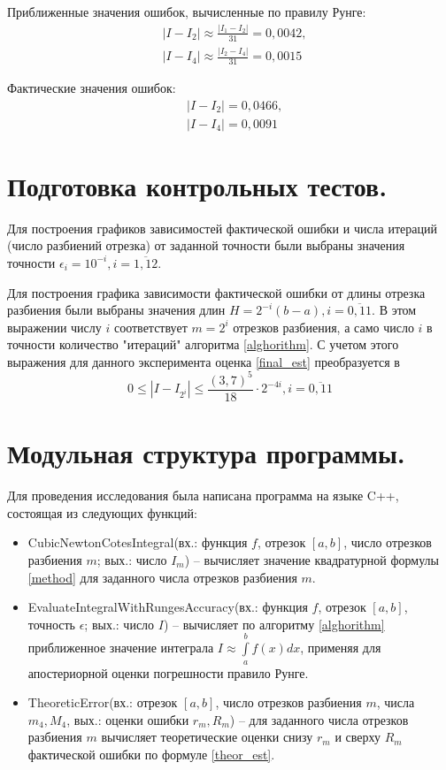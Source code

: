 \documentclass[a4paper, 12pt]{article}
\begin{document}
	Приближенные значения ошибок, вычисленные по правилу Рунге:
	\begin{equation*}
		\begin{aligned}
			&|I-I_2|\approx\frac{|I_1-I_2|}{31}=0,0042,\\
			&|I-I_4|\approx\frac{|I_2-I_4|}{31}=0,0015
		\end{aligned}
	\end{equation*}

	Фактические значения ошибок:
	\begin{equation*}
		\begin{aligned}
			&|I-I_2|=0,0466,\\
			&|I-I_4|=0,0091
		\end{aligned}
	\end{equation*}
	
	\section{Подготовка контрольных тестов.}
	
	Для построения графиков зависимостей фактической ошибки и числа итераций (число разбиений отрезка) от заданной точности были выбраны значения точности $\epsilon_i=10^{-i}, i=\overline{1,12}$. 
	
	Для построения графика зависимости фактической ошибки от длины отрезка разбиения были выбраны значения длин $H=2^{-i}(b-a), i=\overline{0,11}$. В этом выражении числу $i$ соответствует $m=2^{i}$ отрезков разбиения, а само число $i$ в точности количество "итераций" алгоритма \ref{alghorithm}. С учетом этого выражения для данного эксперимента оценка \eqref{final_est} преобразуется в
	\begin{equation}
		0 \leq |I-I_{2^i}| \leq \frac{(3,7)^5}{18}\cdot2^{-4i}, i=\overline{0,11}
	\end{equation}
	
	\section{Модульная структура программы.}
	Для проведения исследования была написана программа на языке C++, состоящая из следующих функций:
	\begin{itemize}
		\item CubicNewtonCotesIntegral(вх.: функция $f$, отрезок $[a,b]$, число отрезков разбиения $m$; вых.: число $I_m$) -- вычисляет значение квадратурной формулы \eqref{method} для заданного числа отрезков разбиения $m$.
		\item EvaluateIntegralWithRungesAccuracy(вх.: функция $f$, отрезок $[a,b]$, точность $\epsilon$; вых.: число $I$) -- вычисляет по алгоритму \ref{alghorithm} приближенное значение интеграла $I\approx\int\limits_a^bf(x)dx$, применяя для апостериорной оценки погрешности правило Рунге.
		\item TheoreticError(вх.: отрезок $[a,b]$, число отрезков разбиения $m$, числа $m_4,M_4$, вых.: оценки ошибки $r_m,R_m$) -- для заданного числа отрезков разбиения $m$ вычисляет теоретические оценки снизу $r_m$ и сверху $R_m$ фактической ошибки по формуле \eqref{theor_est}.
	\end{itemize}
	
\end{document}
